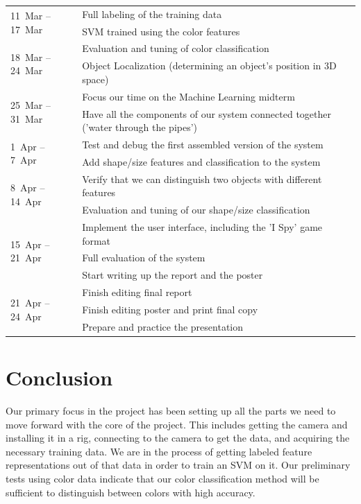 \documentclass[11pt]{article}
\newcommand{\xxx}[1]{{\bf \color{red} #1}}
\newcommand\T{\rule{0pt}{3ex}}
\newcommand\B{\rule[-1.2ex]{0pt}{0pt}}
\begin{document}
\begin{center}
    \begin{tabular}{ | l | l |}
    \hline
    \multirow{2}{*}{11~Mar -- 17~Mar}
	& Full labeling of the training data \T \\
	& SVM trained using the color features \B \\
    \hline
    \multirow{2}{*}{18~Mar -- 24~Mar}
	& Evaluation and tuning of color classification \T \\
	& Object Localization (determining an object's position in 3D space) \B \\
    \hline
    \multirow{2}{*}{25~Mar -- 31~Mar}
	& Focus our time on the Machine Learning midterm \T\\
	& Have all the components of our system connected together ('water through the pipes') \B \\
    \hline
    \multirow{2}{*}{1~Apr -- 7~Apr}
	& Test and debug the first assembled version of the system \T \\
	& Add shape/size features and classification to the system \B\\
    \hline
    \multirow{2}{*}{8~Apr -- 14~Apr}
	& Verify that we can distinguish two objects with different features \T\\
	& Evaluation and tuning of our shape/size classification \B \\
    \hline
    \multirow{3}{*}{15~Apr -- 21~Apr}
	& Implement the user interface, including the 'I Spy' game format \T\\
	& Full evaluation of the system \\
	& Start writing up the report and the poster \B \\
    \hline
    \multirow{3}{*}{21~Apr -- 24~Apr}
	& Finish editing final report \T \\
	& Finish editing poster and print final copy \\
	& Prepare and practice the presentation \B \\
    \hline
    \end{tabular}
\end{center}

\section{Conclusion}
Our primary focus in the project has been setting up all the parts we need to move forward with the core of the project. This includes getting the camera and installing it in a rig, connecting to the camera to get the data, and acquiring the necessary training data. We are in the process of getting labeled feature representations out of that data in order to train an SVM on it. Our preliminary tests using color data indicate that our color classification method will be sufficient to distinguish between colors with high accuracy.
\end{document}
